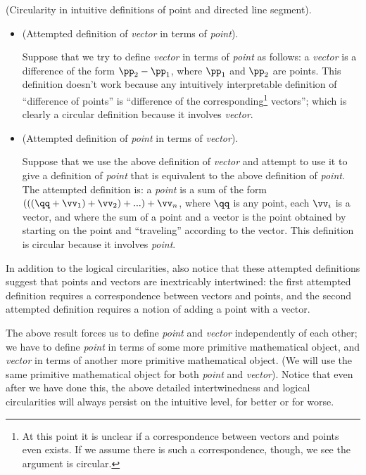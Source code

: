 \begin{remark}
    (Circularity in intuitive definitions of point and directed line segment).
        
    \begin{itemize}
        \item (Attempted definition of \textit{vector} in terms of \textit{point}). 
        
        Suppose that we try to define \textit{vector} in terms of \textit{point} as follows: a \textit{vector} is a difference of the form $\pp_2 - \pp_1$, where $\pp_1$ and $\pp_2$ are points. This definition doesn't work because any intuitively interpretable definition of ``difference of points'' is ``difference of the corresponding\footnote{At this point it is unclear if a correspondence between vectors and points even exists. If we assume there is such a correspondence, though, we see the argument is circular.} vectors''; which is clearly a circular definition because it involves \textit{vector}.
        
        \item (Attempted definition of \textit{point} in terms of \textit{vector}). 
        
        Suppose that we use the above definition of \textit{vector} and attempt to use it to give a definition of \textit{point} that is equivalent to the above definition of \textit{point}. The attempted definition is: a \textit{point} is a sum of the form $(((\qq + \vv_1) + \vv_2) + ...) + \vv_n$, where $\qq$ is any point, each $\vv_i$ is a vector, and where the sum of a point and a vector is the point obtained by starting on the point and ``traveling'' according to the vector. This definition is circular because it involves \textit{point}.
    \end{itemize}
    
    In addition to the logical circularities, also notice that these attempted definitions suggest that points and vectors are inextricably intertwined: the first attempted definition requires a correspondence between vectors and points, and the second attempted definition requires a notion of adding a point with a vector.
\end{remark}

The above result forces us to define \textit{point} and \textit{vector} independently of each other; we have to define \textit{point} in terms of some more primitive mathematical object, and \textit{vector} in terms of another more primitive mathematical object. (We will use the same primitive mathematical object for both \textit{point} and \textit{vector}). Notice that even after we have done this, the above detailed intertwinedness and logical circularities will always persist on the intuitive level, for better or for worse.


